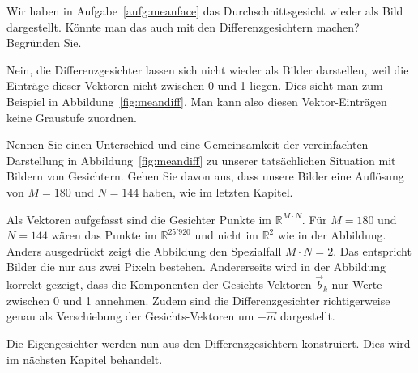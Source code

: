 \begin{aufgabe} \label{aufg:difffaces_images}
	Wir haben in Aufgabe~\ref{aufg:meanface} das Durchschnittsgesicht wieder als Bild dargestellt.
	Könnte man das auch mit den Differenzgesichtern machen?
	Begründen Sie.
\end{aufgabe}
\begin{losung}
	Nein, die Differenzgesichter lassen sich nicht wieder als Bilder darstellen, weil die Einträge dieser Vektoren nicht zwischen 0 und 1 liegen.
	Dies sieht man zum Beispiel in Abbildung~\ref{fig:meandiff}.
	Man kann also diesen Vektor-Einträgen keine Graustufe zuordnen.
\end{losung}
\begin{aufgabe} \label{aufg:hmmc}
	Nennen Sie einen Unterschied und eine Gemeinsamkeit der vereinfachten Darstellung in Abbildung~\ref{fig:meandiff} zu unserer tatsächlichen Situation mit Bildern von Gesichtern.
	Gehen Sie davon aus, dass unsere Bilder eine Auflösung von $M=180$ und $N=144$ haben, wie im letzten Kapitel.
\end{aufgabe}
\begin{losung}
	Als Vektoren aufgefasst sind die Gesichter Punkte im $\mathbb R^{M\cdot N}$.
	Für $M=180$ und $N=144$ wären das Punkte im $\mathbb R^{25'920}$ und nicht im $\mathbb R^2$ wie in der Abbildung.
	Anders ausgedrückt zeigt die Abbildung den Spezialfall $M\cdot N=2$.
	Das entspricht Bilder die nur aus zwei Pixeln bestehen.
	Andererseits wird in der Abbildung korrekt gezeigt, dass die Komponenten der Gesichts-Vektoren $\vec b_k$ nur Werte zwischen 0 und 1 annehmen.
	Zudem sind die Differenzgesichter richtigerweise genau als Verschiebung der Gesichts-Vektoren um $-\vec m$ dargestellt.
\end{losung}
Die Eigengesichter werden nun aus den Differenzgesichtern konstruiert.
Dies wird im nächsten Kapitel behandelt.
%
